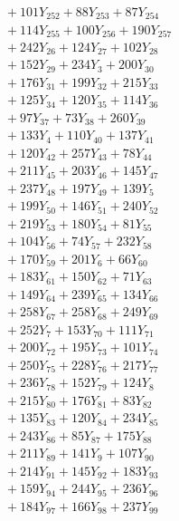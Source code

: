 \documentclass[a4paper,10pt]{article}
\begin{document}
{\begin{align}
&\quad  + 101Y_{252} + 88Y_{253} + 87Y_{254} \\[0.5ex]
&\quad  + 114Y_{255} + 100Y_{256} + 190Y_{257} \\[0.5ex]
&\quad  + 242Y_{26} + 124Y_{27} + 102Y_{28} \\[0.5ex]
&\quad  + 152Y_{29} + 234Y_{3} + 200Y_{30} \\[0.5ex]
&\quad  + 176Y_{31} + 199Y_{32} + 215Y_{33} \\[0.5ex]
&\quad  + 125Y_{34} + 120Y_{35} + 114Y_{36} \\[0.5ex]
&\quad  + 97Y_{37} + 73Y_{38} + 260Y_{39} \\[0.5ex]
&\quad  + 133Y_{4} + 110Y_{40} + 137Y_{41} \\[0.5ex]
&\quad  + 120Y_{42} + 257Y_{43} + 78Y_{44} \\[0.5ex]
&\quad  + 211Y_{45} + 203Y_{46} + 145Y_{47} \\[0.5ex]
&\quad  + 237Y_{48} + 197Y_{49} + 139Y_{5} \\[0.5ex]
&\quad  + 199Y_{50} + 146Y_{51} + 240Y_{52} \\[0.5ex]
&\quad  + 219Y_{53} + 180Y_{54} + 81Y_{55} \\[0.5ex]
&\quad  + 104Y_{56} + 74Y_{57} + 232Y_{58} \\[0.5ex]
&\quad  + 170Y_{59} + 201Y_{6} + 66Y_{60} \\[0.5ex]
&\quad  + 183Y_{61} + 150Y_{62} + 71Y_{63} \\[0.5ex]
&\quad  + 149Y_{64} + 239Y_{65} + 134Y_{66} \\[0.5ex]
&\quad  + 258Y_{67} + 258Y_{68} + 249Y_{69} \\[0.5ex]
&\quad  + 252Y_{7} + 153Y_{70} + 111Y_{71} \\[0.5ex]
&\quad  + 200Y_{72} + 195Y_{73} + 101Y_{74} \\[0.5ex]
&\quad  + 250Y_{75} + 228Y_{76} + 217Y_{77} \\[0.5ex]
&\quad  + 236Y_{78} + 152Y_{79} + 124Y_{8} \\[0.5ex]
&\quad  + 215Y_{80} + 176Y_{81} + 83Y_{82} \\[0.5ex]
&\quad  + 135Y_{83} + 120Y_{84} + 234Y_{85} \\[0.5ex]
&\quad  + 243Y_{86} + 85Y_{87} + 175Y_{88} \\[0.5ex]
&\quad  + 211Y_{89} + 141Y_{9} + 107Y_{90} \\[0.5ex]
&\quad  + 214Y_{91} + 145Y_{92} + 183Y_{93} \\[0.5ex]
&\quad  + 159Y_{94} + 244Y_{95} + 236Y_{96} \\[0.5ex]
&\quad  + 184Y_{97} + 166Y_{98} + 237Y_{99}\nonumber
\end{align}
}
\end{document}

